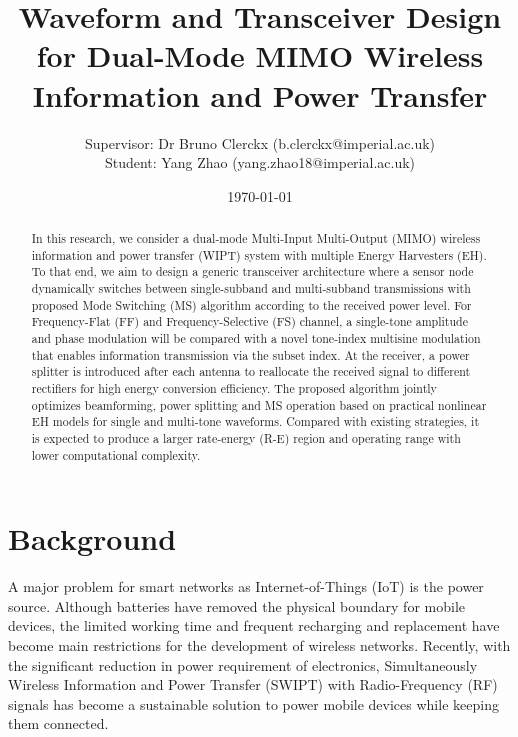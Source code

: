\documentclass[conference]{IEEEtran}
\title{Waveform and Transceiver Design for Dual-Mode MIMO Wireless Information and Power Transfer}
\author{Supervisor: Dr Bruno Clerckx (b.clerckx@imperial.ac.uk)
    \\
    Student: Yang Zhao (yang.zhao18@imperial.ac.uk)}
\date{\today}
\begin{document}
\maketitle

\begin{abstract}
  In this research, we consider a dual-mode Multi-Input Multi-Output (MIMO) wireless information and power transfer (WIPT) system with multiple Energy Harvesters (EH). To that end, we aim to design a generic transceiver architecture where a sensor node dynamically switches between single-subband and multi-subband transmissions with proposed Mode Switching (MS) algorithm according to the received power level. For Frequency-Flat (FF) and Frequency-Selective (FS) channel, a single-tone amplitude and phase modulation will be compared with a novel tone-index multisine modulation that enables information transmission via the subset index. At the receiver, a power splitter is introduced after each antenna to reallocate the received signal to different rectifiers for high energy conversion efficiency. The proposed algorithm jointly optimizes beamforming, power splitting and MS operation based on practical nonlinear EH models for single and multi-tone waveforms. Compared with existing strategies, it is expected to produce a larger rate-energy (R-E) region and operating range with lower computational complexity.
\end{abstract}

\section{Background}
A major problem for smart networks as Internet-of-Things (IoT) is the power source. Although batteries have removed the physical boundary for mobile devices, the limited working time and frequent recharging and replacement have become main restrictions for the development of wireless networks. Recently, with the significant reduction in power requirement of electronics, Simultaneously Wireless Information and Power Transfer (SWIPT) with Radio-Frequency (RF) signals has become a sustainable solution to power mobile devices while keeping them connected.
\end{document}

